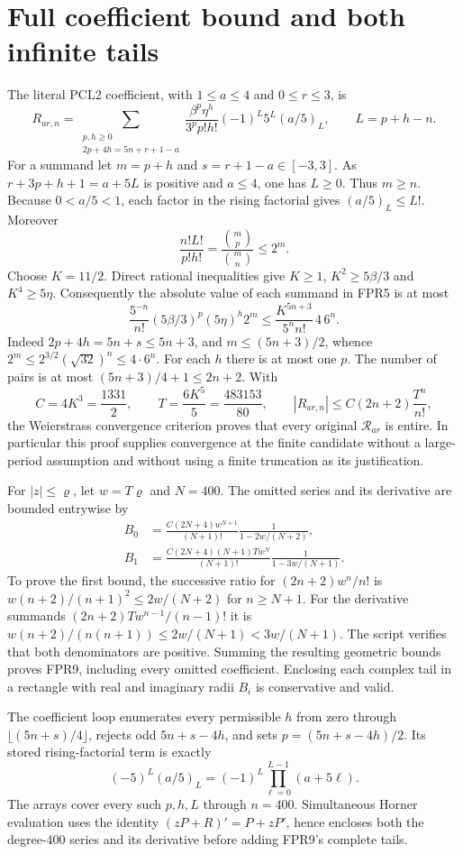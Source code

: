 \documentclass[11pt]{article}
\begin{document}
\section{Full coefficient bound and both infinite tails}
The literal PCL2 coefficient, with $1\le a\le4$ and $0\le r\le3$, is
\[
 R_{ar,n}=
 \sum_{\substack{p,h\ge0\\2p+4h=5n+r+1-a}}
 \frac{\beta^p\eta^h}{3^p p!h!}
 (-1)^L5^L(a/5)_L,\qquad L=p+h-n.
 \tag{FPR5}
\]
For a summand let $m=p+h$ and $s=r+1-a\in[-3,3]$.
As $r+3p+h+1=a+5L$ is positive and $a\le4$, one has $L\ge0$.
Thus $m\ge n$. Because $0<a/5<1$, each factor in the rising
factorial gives $(a/5)_L\le L!$. Moreover
\[
 \frac{n!L!}{p!h!}
 =\frac{\binom{m}{p}}{\binom{m}{n}}\le2^m.
 \tag{FPR6}
\]
Choose $K=11/2$. Direct rational inequalities give
$K\ge1$, $K^2\ge5\beta/3$ and $K^4\ge5\eta$.
Consequently the absolute value of each summand in FPR5 is at most
\[
 \frac{5^{-n}}{n!}(5\beta/3)^p(5\eta)^h2^m
 \le\frac{K^{5n+3}}{5^n n!}\,4\,6^n.
 \tag{FPR7}
\]
Indeed $2p+4h=5n+s\le5n+3$, and
$m\le(5n+3)/2$, whence
$2^m\le2^{3/2}(\sqrt{32})^n\le4\cdot6^n$.
For each $h$ there is at most one $p$. The number of pairs is at
most $(5n+3)/4+1\le2n+2$. With
\[
 C=4K^3=\frac{1331}{2},\qquad
 T=\frac{6K^5}{5}=\frac{483153}{80},
 \qquad |R_{ar,n}|\le C(2n+2)\frac{T^n}{n!},
 \tag{FPR8}
\]
the Weierstrass convergence criterion proves that every original
$\mathcal R_{ar}$ is entire. In particular this proof supplies
convergence at the finite candidate without a large-period
assumption and without using a finite truncation as its justification.

For $|z|\le\varrho$, let $w=T\varrho$ and $N=400$. The omitted
series and its derivative are bounded entrywise by
\[
 \begin{split}
 B_0&=\frac{C(2N+4)w^{N+1}}{(N+1)!}
            \frac1{1-2w/(N+2)},\\
 B_1&=\frac{C(2N+4)(N+1)T w^N}{(N+1)!}
            \frac1{1-3w/(N+1)}.
 \end{split}\tag{FPR9}
\]
To prove the first bound, the successive ratio for
$(2n+2)w^n/n!$ is
$w(n+2)/(n+1)^2\le2w/(N+2)$ for $n\ge N+1$.
For the derivative summands $(2n+2)T w^{n-1}/(n-1)!$ it is
$w(n+2)/(n(n+1))\le2w/(N+1)<3w/(N+1)$.
The script verifies that both denominators are positive. Summing
the resulting geometric bounds proves FPR9, including every
omitted coefficient. Enclosing each complex tail in a rectangle
with real and imaginary radii $B_i$ is conservative and valid.

The coefficient loop enumerates every permissible $h$ from zero
through $\lfloor(5n+s)/4\rfloor$, rejects odd $5n+s-4h$, and
sets $p=(5n+s-4h)/2$. Its stored rising-factorial term is exactly
\[
 (-5)^L(a/5)_L=(-1)^L\prod_{\ell=0}^{L-1}(a+5\ell).
 \tag{FPR10}
\]
The arrays cover every such $p,h,L$ through $n=400$.
Simultaneous Horner evaluation uses the identity
$(zP+R)'=P+zP'$, hence encloses both the degree-400 series and
its derivative before adding FPR9's complete tails.
\end{document}
